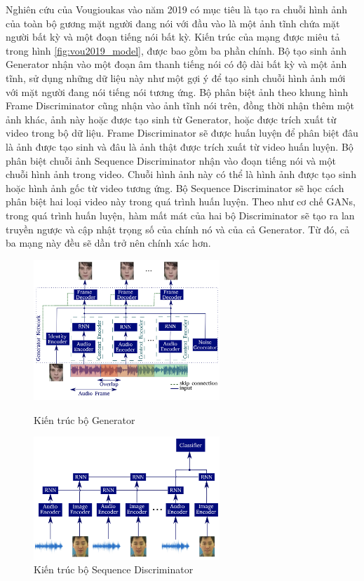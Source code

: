 Nghiên cứu của Vougioukas vào năm 2019 có mục tiêu là tạo ra chuỗi hình ảnh của toàn bộ gương mặt người đang nói với đầu vào là một ảnh tĩnh chứa mặt người bất kỳ và một đoạn tiếng nói bất kỳ. Kiến trúc của mạng được miêu tả trong hình \ref{fig:vou2019_model}, được bao gồm ba phần chính. Bộ tạo sinh ảnh Generator nhận vào một đoạn âm thanh tiếng nói có độ dài bất kỳ và một ảnh tĩnh, sử dụng những dữ liệu này như một gợi ý để tạo sinh chuỗi hình ảnh mới với mặt người đang nói tiếng nói tương ứng. Bộ phân biệt ảnh theo khung hình Frame Discriminator cũng nhận vào ảnh tĩnh nói trên, đồng thời nhận thêm một ảnh khác, ảnh này hoặc được tạo sinh từ Generator, hoặc được trích xuất từ video trong bộ dữ liệu. Frame Discriminator sẽ được huấn luyện để phân biệt đâu là ảnh được tạo sinh và đâu là ảnh thật được trích xuất từ video huấn luyện. Bộ phân biệt chuỗi ảnh Sequence Discriminator nhận vào đoạn tiếng nói và một chuỗi hình ảnh trong video. Chuỗi hình ảnh này có thể là hình ảnh được tạo sinh hoặc hình ảnh gốc từ video tương ứng. Bộ Sequence Discriminator sẽ học cách phân biệt hai loại video này trong quá trình huấn luyện. Theo như cơ chế GANs, trong quá trình huấn luyện, hàm mất mát của hai bộ Discriminator sẽ tạo ra lan truyền ngược và cập nhật trọng số của chính nó và của cả Generator. Từ đó, cả ba mạng này đều sẽ dần trở nên chính xác hơn.

\begin{figure}[H]
    \centering
    \begin{minipage}{0.48\textwidth}
        \includegraphics[width=7cm]{./content/images/vou2019_gen.png}
        \caption{Kiến trúc bộ Generator}
        \label{fig:vou2019_gen}
    \end{minipage}\hfill
    \begin{minipage}{0.48\textwidth}
        \includegraphics[width=7cm]{./content/images/vou2019_seq_dis.png}
        \caption{Kiến trúc bộ Sequence Discriminator}
        \label{fig:vou2019_seq_dis}
    \end{minipage}
\end{figure}

